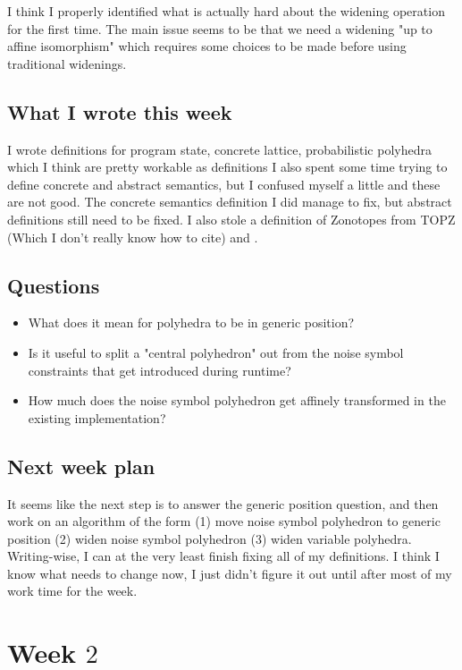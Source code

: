 \documentclass{amsart}
\begin{document}
I think I properly identified what is actually hard about the widening operation for the first time.
The main issue seems to be that we need a widening "up to affine isomorphism" which requires some choices to be made before using traditional widenings.


\subsection{What I wrote this week}
I wrote definitions for program state, concrete lattice, probabilistic polyhedra which I think are pretty workable as definitions
I also spent some time trying to define concrete and abstract semantics, but I confused myself a little and these are not good. 
The concrete semantics definition I did manage to fix, but abstract definitions still need to be fixed.
I also stole a definition of Zonotopes from TOPZ (Which I don't really know how to cite) and \cite{ZonotopesTaylor1+}.

\subsection{Questions}
\begin{itemize}
  \item What does it mean for polyhedra to be in generic position?
  \item Is it useful to split a "central polyhedron" out from the noise symbol constraints that get introduced during runtime?
  \item How much does the noise symbol polyhedron get affinely transformed in the existing implementation?
\end{itemize}

\subsection{Next week plan}
It seems like the next step is to answer the generic position question, and then work on an algorithm of the form (1) move noise symbol polyhedron to generic position (2) widen noise symbol polyhedron (3) widen variable polyhedra.
Writing-wise, I can at the very least finish fixing all of my definitions. 
I think I know what needs to change now, I just didn't figure it out until after most of my work time for the week.

\section{Week $2$}
\end{document}
